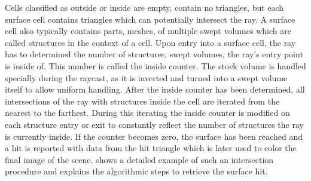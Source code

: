 Cells classified as outside or inside are empty, \ie contain no triangles, but each surface cell contains triangles which can potentially intersect the ray.
A surface cell also typically contains parts, \ie meshes, of multiple swept volumes which are called structures in the context of a cell.
Upon entry into a surface cell, the ray has to determined the number of structures, \ie swept volumes, the ray's entry point is inside of.
This number is called the inside counter.
The stock volume is handled specially during the raycast, as it is inverted and turned into a swept volume itself to allow uniform handling.
After the inside counter has been determined, all intersections of the ray with structures inside the cell are iterated from the nearest to the farthest.
During this iterating the inside counter is modified on each structure entry or exit to constantly reflect the number of structures the ray is currently inside.
If the counter becomes zero, the surface has been reached and a hit is reported with data from the hit triangle which is later used to color the final image of the scene.
 shows a detailed example of such an intersection procedure and explains the algorithmic steps to retrieve the surface hit.

